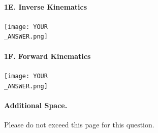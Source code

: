 \newpage
\paragraph{1E. Inverse Kinematics}
\begin{center}
    \texttt{[image: YOUR\\\_ANSWER.png]}
\end{center}

\paragraph{1F. Forward Kinematics}
\begin{center}
    \texttt{[image: YOUR\\\_ANSWER.png]}
\end{center}

\newpage

\paragraph{Additional Space.}
Please do not exceed this page for this question.
